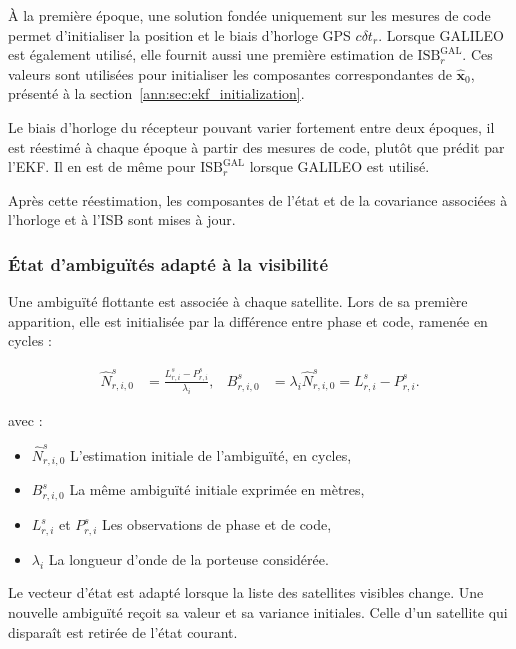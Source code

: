 À la première époque, une solution fondée uniquement sur les mesures de code
permet d'initialiser la position et le biais d'horloge GPS
$c\delta t_r$. Lorsque GALILEO est également utilisé, elle fournit aussi une
première estimation de $\mathrm{ISB}_r^{\mathrm{GAL}}$. Ces valeurs sont
utilisées pour initialiser les composantes correspondantes de
$\widehat{\mathbf x}_0$, présenté à la
section~\ref{ann:sec:ekf_initialization}.

Le biais d'horloge du récepteur pouvant varier fortement entre deux époques,
il est réestimé à chaque époque à partir des mesures de code, plutôt que prédit
par l'EKF. Il en est de même pour $\mathrm{ISB}_r^{\mathrm{GAL}}$ lorsque
GALILEO est utilisé.

Après cette réestimation, les composantes de l'état et de la covariance
associées à l'horloge et à l'ISB sont mises à jour.


\subsubsection{État d'ambiguïtés adapté à la visibilité}

Une ambiguïté flottante est associée à chaque satellite.
Lors de sa première apparition, elle est initialisée par la
différence entre phase et code, ramenée en cycles :

\begin{align}
\widehat N_{r,i,0}^s
&=
\frac{L_{r,i}^s-P_{r,i}^s}{\lambda_i},
&
B_{r,i,0}^s
&=
\lambda_i\widehat N_{r,i,0}^s
=L_{r,i}^s-P_{r,i}^s.
\label{ppp:eq:ambiguity_initialization}
\end{align}

avec :

\begin{itemize}
    \item $\widehat N_{r,i,0}^s$ L'estimation initiale de l'ambiguïté, en
    cycles,
    \item $B_{r,i,0}^s$ La même ambiguïté initiale exprimée en mètres,
    \item $L_{r,i}^s$ et $P_{r,i}^s$ Les observations de phase et de code,
    \item $\lambda_i$ La longueur d'onde de la porteuse considérée.
\end{itemize}

Le vecteur d'état est adapté lorsque la liste des satellites visibles change.
Une nouvelle ambiguïté reçoit sa valeur et sa variance initiales. Celle d'un
satellite qui disparaît est retirée de l'état courant.

